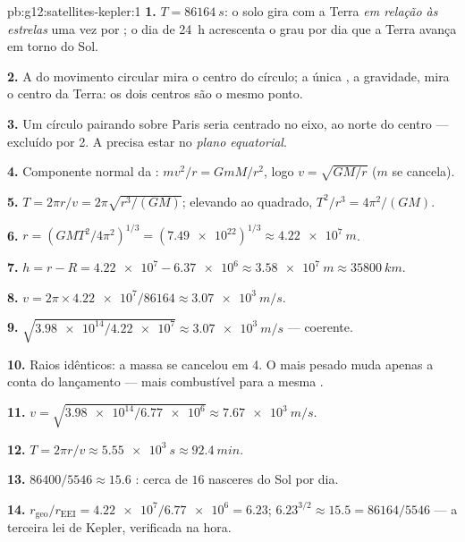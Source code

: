 \begin{solution}{pb:g12:satellites-kepler:1}
\textbf{1.} $T = \qty{86164}{s}$: o solo gira com a Terra \emph{em
relação às estrelas} uma vez por ; o dia de \qty{24}{h}
acrescenta o grau por dia que a Terra avança em torno do Sol.

\textbf{2.} A  do movimento circular mira o centro do
círculo; a única , a gravidade, mira o centro da Terra: os dois
centros são o mesmo ponto.

\textbf{3.} Um círculo pairando sobre Paris seria centrado no eixo, ao
norte do centro --- excluído por 2. A  precisa estar no
\emph{plano equatorial}.

\textbf{4.} Componente normal da :
$m v^2/r = GmM/r^2$, logo $v = \sqrt{GM/r}$ ($m$ se cancela).

\textbf{5.} $T = 2\pi r/v = 2\pi\sqrt{r^3/(GM)}$; elevando ao quadrado,
$T^2/r^3 = 4\pi^2/(GM)$.

\textbf{6.} $r = \left(GMT^2/4\pi^2\right)^{1/3} = (\num{7.49e22})^{1/3}
\approx \qty{4.22e7}{m}$.

\textbf{7.} $h = r - R = \num{4.22e7} - \num{6.37e6} \approx
\qty{3.58e7}{m} \approx \qty{35800}{km}$.

\textbf{8.} $v = 2\pi \times \num{4.22e7}/\num{86164} \approx
\qty{3.07e3}{m/s}$.

\textbf{9.} $\sqrt{\num{3.98e14}/\num{4.22e7}} \approx
\qty{3.07e3}{m/s}$ --- coerente.

\textbf{10.} Raios idênticos: a massa se cancelou em 4. O  mais
pesado muda apenas a conta do lançamento --- mais combustível para a
mesma .

\textbf{11.} $v = \sqrt{\num{3.98e14}/\num{6.77e6}} \approx
\qty{7.67e3}{m/s}$.

\textbf{12.} $T = 2\pi r/v \approx \qty{5.55e3}{s} \approx
\qty{92.4}{min}$.

\textbf{13.} $\num{86400}/5546 \approx 15.6$ : cerca de $16$
nasceres do Sol por dia.

\textbf{14.} $r_{\text{geo}}/r_{\text{EEI}} = \num{4.22e7}/\num{6.77e6}
= 6.23$; $6.23^{3/2} \approx 15.5 = \num{86164}/5546$ --- a terceira lei
de Kepler, verificada na hora.


\end{solution}
